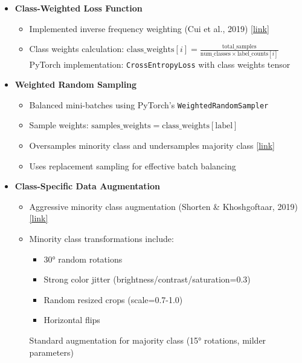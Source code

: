 \documentclass[a4paper,12pt]{report}
\begin{document}
\begin{itemize}
    \item \textbf{Class-Weighted Loss Function}
    \begin{itemize}
        \item Implemented inverse frequency weighting (Cui et al., 2019) \href{https://openaccess.thecvf.com/content_CVPR_2019/papers/Cui_Class-Balanced_Loss_Based_on_Effective_Number_of_Samples_CVPR_2019_paper.pdf}{[link]}
        \item Class weights calculation: \( \text{class\_weights}[i] = \frac{\text{total\_samples}}{\text{num\_classes} \times \text{label\_counts}[i]} \)
        \subitem PyTorch implementation: \texttt{CrossEntropyLoss} with class weights tensor
    \end{itemize}
    
    \item \textbf{Weighted Random Sampling}
    \begin{itemize}
        \item Balanced mini-batches using PyTorch's \texttt{WeightedRandomSampler}
        \item Sample weights: \( \text{samples\_weights} = \text{class\_weights}[\text{label}] \)
        \item Oversamples minority class and undersamples majority class \href{https://www.sciencedirect.com/science/article/pii/S0893608018302107}{[link]}
        \item Uses replacement sampling for effective batch balancing
    \end{itemize}
    
    \item \textbf{Class-Specific Data Augmentation}
    \begin{itemize}
        \item Aggressive minority class augmentation (Shorten \& Khoshgoftaar, 2019) \href{https://journalofbigdata.springeropen.com/articles/10.1186/s40537-019-0197-0}{[link]}
        \item Minority class transformations include:
        \begin{itemize}
            \item 30° random rotations
            \item Strong color jitter (brightness/contrast/saturation=0.3)
            \item Random resized crops (scale=0.7-1.0)
            \item Horizontal flips
        \end{itemize}
        \subitem Standard augmentation for majority class (15° rotations, milder parameters)
    \end{itemize}
\end{itemize}
\end{document}
